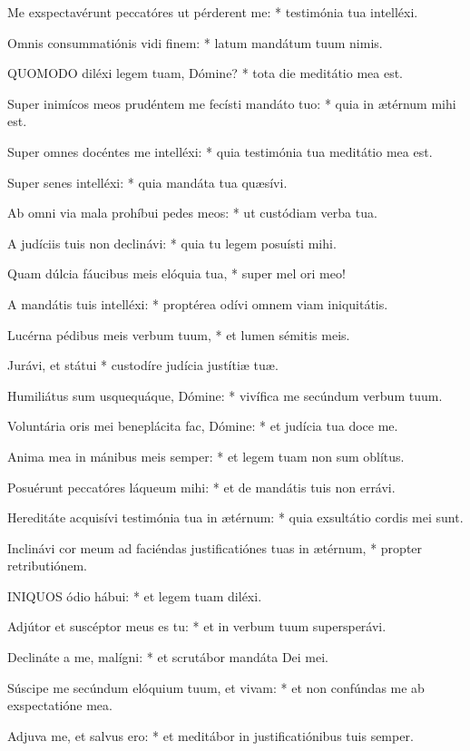 Me exspectavérunt peccatóres ut pérderent me: * testimónia tua intelléxi.

Omnis consummatiónis vidi finem: * latum mandátum tuum nimis.


\lettrine[lines=2]{Q}{UOMODO} diléxi legem tuam, Dómine? * tota die meditátio mea est.

Super inimícos meos prudéntem me fecísti mandáto tuo: * quia in ætérnum mihi est.

Super omnes docéntes me intelléxi: * quia testimónia tua meditátio mea est.

Super senes intelléxi: * quia mandáta tua quæsívi.

Ab omni via mala prohíbui pedes meos: * ut custódiam verba tua.

A judíciis tuis non declinávi: * quia tu legem posuísti mihi.

Quam dúlcia fáucibus meis elóquia tua, * super mel ori meo!

A mandátis tuis intelléxi: * proptérea odívi omnem viam iniquitátis.

Lucérna pédibus meis verbum tuum, * et lumen sémitis meis.

Jurávi, et státui * custodíre judícia justítiæ tuæ.

Humiliátus sum usquequáque, Dómine: * vivífica me secúndum verbum tuum.

Voluntária oris mei beneplácita fac, Dómine: * et judícia tua doce me.

Anima mea in mánibus meis semper: * et legem tuam non sum oblítus.

Posuérunt peccatóres láqueum mihi: * et de mandátis tuis non errávi.

Hereditáte acquisívi testimónia tua in ætérnum: * quia exsultátio cordis mei sunt.

Inclinávi cor meum ad faciéndas justificatiónes tuas in ætérnum, * propter retributiónem.


\lettrine[lines=2]{I}{NIQUOS} ódio hábui: * et legem tuam diléxi.

Adjútor et suscéptor meus es tu: * et in verbum tuum supersperávi.

Declináte a me, malígni: * et scrutábor mandáta Dei mei.

Súscipe me secúndum elóquium tuum, et vivam: * et non confúndas me ab exspectatióne mea.

Adjuva me, et salvus ero: * et meditábor in justificatiónibus tuis semper.

